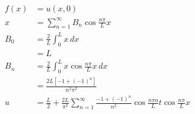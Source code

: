 \documentclass{article}
\begin{document}
\begin{align*}
  f(x)   & = u(x, 0)                                                                                                                     \\
  x      & = \sum_{n = 1}^\infty B_n \cos \frac{n \pi}{L} x                                                                              \\
  B_0    & = \frac{2}{L} \int_0^L x \,d x                                                                                                \\
         & = L                                                                                                                           \\
  B_n    & = \frac{2}{L} \int_0^L x \cos \frac{n \pi}{L} x \,d x                                                                         \\
         & = \frac{2 L [-1 + (-1)^n]}{n^2 \pi^2}                                                                                         \\
  u      & = \frac{L}{2} + \frac{2 L}{\pi^2} \sum_{n = 1}^\infty \frac{-1 + (-1)^n}{n^2} \cos \frac{n \pi a}{L} t \cos \frac{n \pi}{L} x
\end{align*}

\setcounter{subsubsection}{14}
\subsubsection{}
\end{document}
